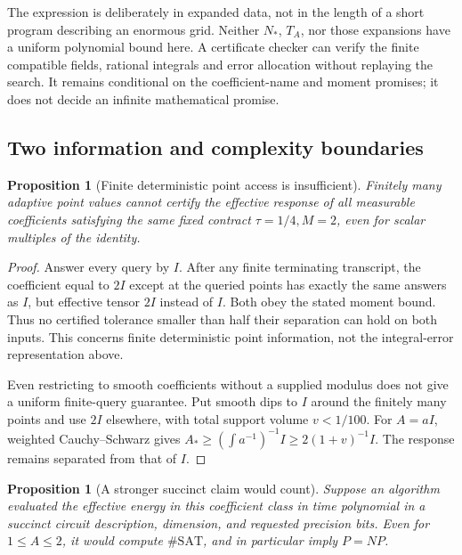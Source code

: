 \documentclass[11pt,a4paper]{article}
\numberwithin{equation}{section}
\newtheorem{proposition}[theorem]{Proposition}
\theoremstyle{definition}
\theoremstyle{remark}\newtheorem{remark}[theorem]{Remark}
\newcommand{\Id}{I}
\begin{document}
The expression is deliberately in expanded data, not in the length
of a short program describing an enormous grid. Neither \(N_*\),
\(T_A\), nor those expansions have a uniform polynomial bound here.
A certificate checker can verify the finite compatible fields,
rational integrals and error allocation without replaying the search.
It remains conditional on the coefficient-name and moment promises;
it does not decide an infinite mathematical promise.

\subsection{Two information and complexity boundaries}

\begin{proposition}[Finite deterministic point access is insufficient]
\label{prop:point-access}
Finitely many adaptive point values cannot certify the effective
response of all measurable coefficients satisfying the same fixed
contract \(\tau=1/4,M=2\), even for scalar multiples of the identity.
\end{proposition}

\begin{proof}
Answer every query by \(\Id\). After any finite terminating transcript,
the coefficient equal to \(2\Id\) except at the queried points has
exactly the same answers as \(\Id\), but effective tensor \(2\Id\)
instead of \(\Id\). Both obey the stated moment bound. Thus no
certified tolerance smaller than half their separation can hold
on both inputs. This concerns finite deterministic point information,
not the integral-error representation above.

Even restricting to smooth coefficients without a supplied modulus
does not give a uniform finite-query guarantee. Put smooth dips
to \(\Id\) around the finitely many points and use \(2\Id\) elsewhere,
with total support volume \(v<1/100\). For \(A=a\Id\),
weighted Cauchy--Schwarz gives
\(A_*\geq(\int a^{-1})^{-1}\Id\geq2(1+v)^{-1}\Id\).
The response remains separated from that of \(\Id\).
\end{proof}

\begin{proposition}[A stronger succinct claim would count]\label{prop:counting}
Suppose an algorithm evaluated the effective energy in this coefficient
class in time polynomial in a succinct circuit description, dimension,
and requested precision bits. Even for \(1\leq A\leq2\), it would
compute \(\#\mathrm{SAT}\), and in particular imply \(P=NP\).
\end{proposition}
\end{document}
